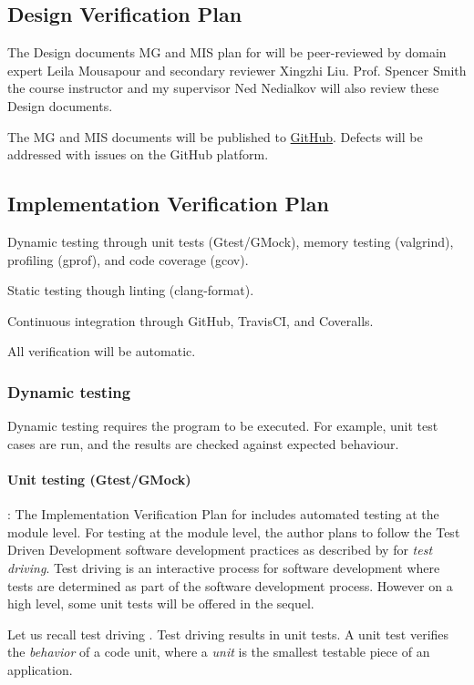 \documentclass[12pt, titlepage]{article}
\begin{document}
\subsection{Design Verification Plan}

The Design documents MG and MIS plan for  will be peer-reviewed by
domain expert Leila Mousapour and secondary reviewer Xingzhi Liu.
Prof. Spencer Smith the course instructor and my supervisor Ned Nedialkov will also review these Design
documents.

The MG and MIS documents will be published to \href{https://github.com/JohnErnsthausen/roc}{GitHub}.
Defects will be addressed with issues on the GitHub platform.

\subsection{Implementation Verification Plan}

Dynamic testing through unit tests (Gtest/GMock), memory testing (valgrind), profiling (gprof),
and code coverage (gcov).

Static testing though linting (clang-format).

Continuous integration through GitHub, TravisCI, and Coveralls.

All verification will be automatic.

\subsubsection{Dynamic testing}
Dynamic testing requires the program to be executed. For example, unit test cases
are run, and the results are checked against expected behaviour.

\paragraph{Unit testing (Gtest/GMock)}:
The Implementation Verification Plan for  includes automated testing at the module level.
For testing at the module level, the author plans to follow the Test Driven Development
software development practices as described by \cite{langr2013} for {\it test driving}.
Test driving is an interactive process for software development where tests are determined
as part of the software development process. However on a high level, some unit tests
will be offered in the sequel.

Let us recall test driving \cite{langr2013}.
Test driving results in unit tests. A unit test verifies the {\it behavior} of a code unit,
where a {\it unit} is the smallest testable piece of an application.
\end{document}
